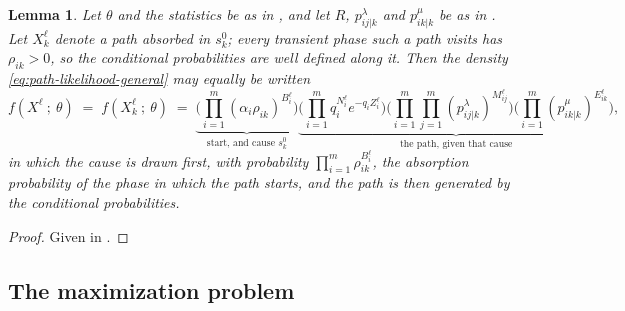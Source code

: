 \documentclass{article}
\newtheorem{lemma}{Lemma}
\newenvironment{subrevision}{}{}
\newcommand{\subchg}[1]{#1}
\begin{document}
\begin{subrevision}
\begin{lemma}
\label{lem:cause-specific}
Let $\theta$ and the statistics be as in , and let $R$,
$p^\lambda_{ij|k}$ and $p^\mu_{ik|k}$ be as in . Let $X^\ell_k$ denote a path
absorbed in $s^0_k$; every transient phase such a path visits has $\rho_{ik}>0$, so the conditional
probabilities are well defined along it. Then the density \eqref{eq:path-likelihood-general} may equally be written
%
\begin{equation}
\label{eq:path-likelihood-cause}
f(X^\ell~;~\theta)
\;=\;
f(X^\ell_k~;~\theta)
\;=\;
\underbrace{\Big( \prod_{i=1}^m (\alpha_i \rho_{ik})^{B^\ell_i} \Big)}_{\text{start, and cause } s^0_k}
\underbrace{\Big( \prod_{i=1}^m q_i^{N^\ell_i} e^{-q_i Z^\ell_i} \Big)
\Big( \prod_{i=1}^m \prod_{j=1}^m (p^\lambda_{ij|k})^{M^\ell_{ij}} \Big)
\Big( \prod_{i=1}^m (p^\mu_{ik|k})^{E^\ell_{ik}} \Big)}_{\text{the path, given that cause}} ,
\end{equation}
%
in which the cause is drawn first, with probability $\prod_{i=1}^m \rho_{ik}^{B^\ell_i}$, the
absorption probability of the phase in which the path starts, and the path is then generated by the
conditional probabilities.

\end{lemma}

\begin{proof}
Given in .
\end{proof}
\end{subrevision}

\subsection{\subchg{The maximization problem}}
\label{sec:mle-exact}
\end{document}
